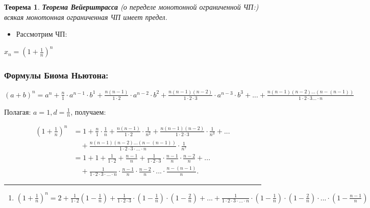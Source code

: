 \documentclass[12pt, a4paper]{article}
\newtheorem{theorem}{Теорема}[subsection]
\theoremstyle{remark}
\begin{document}
	\begin{theorem}
		\textbf{Теорема Вейерштрасса} (о переделе монотонной ограниченной ЧП:) всякая монотонная ограниченная ЧП имеет предел.
	\end{theorem}
	
	\begin{itemize}
		\item Рассмотрим ЧП:
	\end{itemize}
	$x_n = \left(1 + \frac{1}{n}\right)^{n}$	
	
	\subsubsection{Формулы Биома Ньютона:}
	$(a + b)^{n} = a^{n} + \frac{n}{1} \cdot a^{n - 1} \cdot b^{1} + \frac{n(n - 1)}{1 \cdot 2} \cdot a^{n - 2} \cdot b^{2} + \frac{n(n - 1)(n - 2)}{1 \cdot 2 \cdot 3} \cdot a^{n - 3} \cdot b^{3} + ... + \frac{n(n - 1)(n - 2) ... (n - (n - 1))}{1 \cdot 2 \cdot 3 ... \cdot n}$
	\vspace{0.4cm}
	
	Полагая: $a = 1, d = \frac{1}{n}$, получаем:
	\vspace{0.4cm}
	
	\begin{align*}
		\left(1 + \frac{1}{n}\right)^{n} &= 1 + \frac{n}{1} \cdot \frac{1}{n} + \frac{n(n - 1)}{1 \cdot 2} \cdot \frac{1}{n^{2}} + \frac{n(n - 1)(n - 2)}{1 \cdot 2 \cdot 3} \cdot \frac{1}{n^{3}} + ... \\
		&\quad + \frac{n(n - 1)(n - 2) ... (n - (n - 1))}{1 \cdot 2 \cdot 3 \cdot ... \cdot n} \cdot \frac{1}{n^{?}} \\
		&= 1 + 1 + \frac{1}{1 \cdot 2} + \frac{n - 1}{n} + \frac{1}{1 \cdot 2 \cdot 3} \cdot \frac{n - 1}{n} \cdot \frac{n - 2}{n} + ... \\
		&\quad + \frac{1}{1 \cdot 2 \cdot 3 \cdot ... \cdot n} \cdot \frac{n - 1}{n} \cdot \frac{n - 2}{n} \cdot ... \cdot \frac{n - (n - 1)}{n}.
	\end{align*}
	
	\vspace{0.5cm} 
	\hrule
	
	\begin{enumerate}[label=(\arabic*), start = 1]
		\item $\left(1 + \frac{1}{n}\right)^{n} = 2 + \frac{1}{1 \cdot 2} \left(1 - \frac{1}{n}\right) + \frac{1}{1 \cdot 2 \cdot 3} \cdot \left(1 - \frac{1}{n}\right) \cdot \left(1 - \frac{2}{n}\right) + ... + \frac{1}{1 \cdot 2 \cdot 3 \cdot ... \cdot n} \cdot \left(1 - \frac{1}{n}\right) \cdot \left(1 - \frac{2}{n}\right) \cdot ... \cdot \left(1 - \frac{n - 1}{n}\right)$
	\end{enumerate}
	
\end{document}
